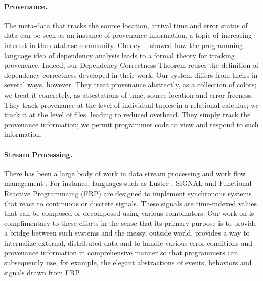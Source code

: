 

\paragraph*{Provenance.}  The \padsd{} meta-data that tracks the
source location, arrival time and error status of data can be seen as
an instance of provenance information, a topic of increasing interest
in the database community.  Cheney~\etal{}~\cite{cheney-dbpl07} showed
how the programming language idea of dependency analysis leads to a
formal theory for tracking provenence.  Indeed, our Dependency
Correctness Theorem reuses the definition of dependency correctness
developed in their work.  Our system differs from theirs in several
ways, however.  They treat provenance abstractly, as a collection of
colors; we treat it concretely, as attestations of time, source
location and error-freeness.  They track provenance at the level of
individual tuples in a relational calculus; we track it at the level
of files, leading to reduced overhead.  They simply track the
provenance information; we permit programmer code to view and
respond to such information.

\paragraph*{Stream Processing.}
There has been a large body of work in data stream processing and work
flow management \cite{Golab03}. For instance, languages such as Lustre
\cite{CaspiPHP87}, SIGNAL \cite{AmagbegnonBG95} and Functional
Reactive Programmaing (FRP) \cite{ElliottH97,WanH00} are designed to
implement synchronous systems that react to continuous or discrete
signals. These signals are time-indexed values that can be composed or
decomposed using various combinators.  Our work on \padsd{} is
complimentary to these efforts in the sense that its primary purpose
is to provide a bridge between such systems and the messy, outside
world.  \padsd{} provides a way to internalize external, distributed
data and to handle various error conditions and provenance information
in comprehensive manner so that programmers can subsequently use, for
example, the elegant abstractions of events, behaviors and signals
drawn from FRP.


